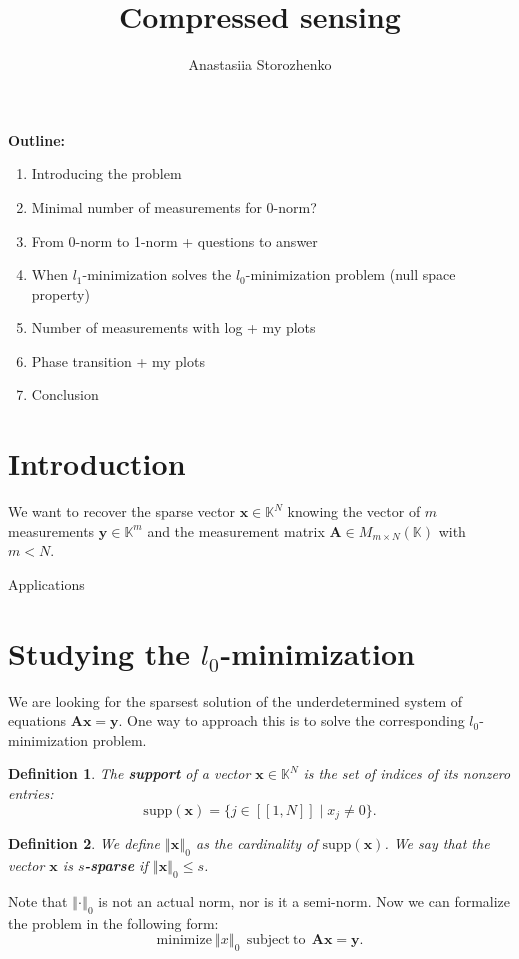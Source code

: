 \documentclass[11pt]{article}
\title{Compressed sensing}
\author{Anastasiia Storozhenko}
\newtheorem{definition}{Definition}[section]
\newcommand{\norm}[1]{\left\Vert#1\right\Vert}
\begin{document}
\maketitle

\textbf{Outline:}

\begin{enumerate}
    \item Introducing the problem
    \item Minimal number of measurements for 0-norm?
    \item From 0-norm to 1-norm + questions to answer
    \item When $l_1$-minimization solves the $l_0$-minimization problem (null space property)
    \item Number of measurements with log + my plots
    \item Phase transition + my plots
    \item Conclusion
\end{enumerate}

\section{Introduction}
We want to recover the sparse vector $\mathbf{x} \in \mathbb{K}^N$ knowing the vector of $m$ measurements $\mathbf{y} \in \mathbb{K}^m$ and the measurement matrix $\mathbf{A} \in M_{m \times N}(\mathbb{K})$ with $m < N$.

Applications

\section{Studying the $l_0$-minimization}

We are looking for the sparsest solution of the underdetermined system of equations $\mathbf{Ax=y}$.
One way to approach this is to solve the corresponding $l_0$-minimization problem.

\begin{definition}
    The \textbf{support} of a vector $\mathbf{x} \in \mathbb{K}^N$ is the set of indices of its nonzero entries:
    $$ \mathrm{supp}(\mathbf{x}) = \{ j \in [\![1,N]\!] \mid x_j \neq 0 \}. $$
\end{definition}

\begin{definition}
    We define $\norm{\mathbf{x}}_0$ as the cardinality of $\mathrm{supp}(\mathbf{x})$.
    We say that the vector $\mathbf{x}$ is \textbf{$s$-sparse} if $\norm{\mathbf{x}}_0 \leq s$.
\end{definition}
Note that $\norm{\cdot}_0$ is not an actual norm, nor is it a semi-norm.
Now we can formalize the problem in the following form:
\begin{equation}
    \mathrm{minimize} \ \norm{x}_0 \ \ \mathrm{subject\ to} \ \ \mathbf{Ax=y}.
\end{equation}\label{eq:l0}
\end{document}
